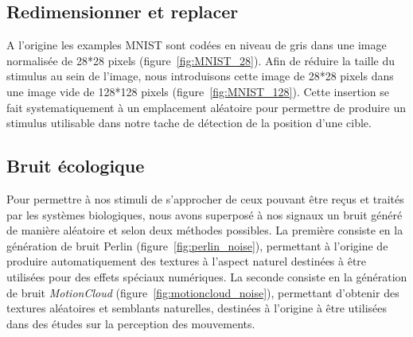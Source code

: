 \subsection{Redimensionner et replacer}
A l'origine les examples MNIST sont codées en niveau de gris dans une image normalisée de 28*28 pixels (figure~\ref{fig:MNIST_28}).
Afin de réduire la taille du stimulus au sein de l'image, nous introduisons cette image de 28*28 pixels dans une image vide de 128*128 pixels (figure~\ref{fig:MNIST_128}).
Cette insertion se fait systematiquement à un emplacement aléatoire pour permettre de produire un stimulus utilisable dans notre tache de détection de la position d'une cible. \\

\subsection{Bruit écologique}
Pour permettre à nos stimuli de s'approcher de ceux pouvant être reçus et traités par les systèmes biologiques, nous avons superposé à nos signaux un bruit généré de manière aléatoire et selon deux méthodes possibles.
La première consiste en la génération de bruit Perlin \autocite{Perlin1985} (figure~\ref{fig:perlin_noise}), permettant à l'origine de produire automatiquement des textures à l'aspect naturel destinées à être utilisées pour des effets spéciaux numériques.
La seconde consiste en la génération de bruit \textit{MotionCloud} (figure~\ref{fig:motioncloud_noise}), permettant d'obtenir des textures aléatoires et semblants naturelles, destinées à l'origine à être utilisées dans des études sur la perception des mouvements. \autocite{Leon2012}

